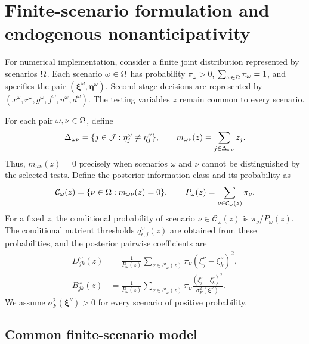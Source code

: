 \section{Finite-scenario formulation and endogenous nonanticipativity}
\label{sec:scenario}

For numerical implementation, consider a finite joint distribution
represented by scenarios $\Omega$. Each scenario $\omega\in\Omega$ has
probability $\pi_\omega>0$, $\sum_{\omega\in\Omega}\pi_\omega=1$,
and specifies the pair
$(\boldsymbol\xi^\omega,\boldsymbol\eta^\omega)$.
Second-stage decisions are represented by
$(x^\omega,r^\omega,g^\omega,f^\omega,u^\omega,d^\omega)$.
The testing variables $z$ remain common to every scenario.

For each pair $\omega,\nu\in\Omega$, define
\begin{equation}
 \Delta_{\omega\nu}
  =\{j\in\mathcal{J}:\eta_j^\omega\ne\eta_j^\nu\},\qquad
 m_{\omega\nu}(z)=\sum_{j\in\Delta_{\omega\nu}}z_j.
 \label{eq:distinguishability}
\end{equation}
Thus, $m_{\omega\nu}(z)=0$ precisely when scenarios $\omega$ and
$\nu$ cannot be distinguished by the selected tests. Define the
posterior information class and its probability as
\begin{equation}
 \mathcal C_\omega(z)
  =\{\nu\in\Omega:m_{\omega\nu}(z)=0\},\qquad
 P_\omega(z)=\sum_{\nu\in\mathcal C_\omega(z)}\pi_\nu.
 \label{eq:information-class}
\end{equation}
For a fixed $z$, the conditional probability of scenario
$\nu\in\mathcal C_\omega(z)$ is $\pi_\nu/P_\omega(z)$.
The conditional nutrient thresholds
$q_{\epsilon,j}^\omega(z)$ are obtained from these probabilities,
and the posterior pairwise coefficients are
\begin{align}
 D_{jk}^\omega(z)
 &=\frac{1}{P_\omega(z)}
   \sum_{\nu\in\mathcal C_\omega(z)}\pi_\nu
          (\xi_j^\nu-\xi_k^\nu)^2,
 \label{eq:D-scenario}\\
 B_{jk}^\omega(z)
 &=\frac{1}{P_\omega(z)}
   \sum_{\nu\in\mathcal C_\omega(z)}\pi_\nu
   \frac{(\xi_j^\nu-\xi_k^\nu)^2}
        {\sigma_F^2(\boldsymbol\xi^\nu)}.
 \label{eq:B-scenario}
\end{align}
We assume $\sigma_F^2(\boldsymbol\xi^\nu)>0$ for every
scenario of positive probability.

\subsection{Common finite-scenario model}
\label{subsec:finite-core}

